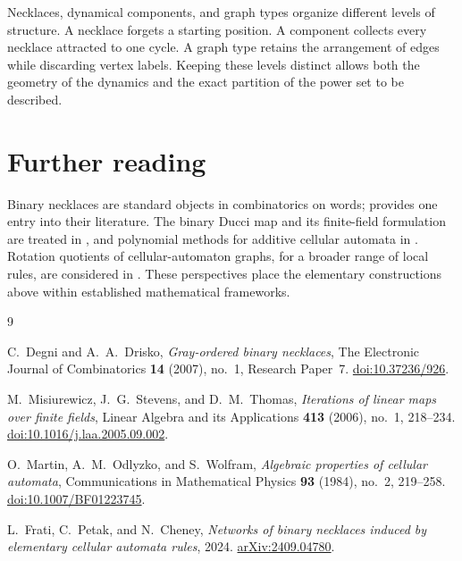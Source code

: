 \documentclass[11pt]{article}
\theoremstyle{definition}
\numberwithin{equation}{section}
\begin{document}
Necklaces, dynamical components, and graph types organize different
levels of structure. A necklace forgets a starting position. A
component collects every necklace attracted to one cycle. A graph
type retains the arrangement of edges while discarding vertex labels.
Keeping these levels distinct allows both the geometry of the
dynamics and the exact partition of the power set to be described.

\section*{Further reading}

Binary necklaces are standard objects in combinatorics on words;
\cite{DegniDrisko} provides one entry into their literature. The
binary Ducci map and its finite-field formulation are treated in
\cite{MisiurewiczStevensThomas}, and polynomial methods for additive
cellular automata in \cite{MartinOdlyzkoWolfram}. Rotation quotients
of cellular-automaton graphs, for a broader range of local rules,
are considered in \cite{FratiPetakCheney}. These perspectives place
the elementary constructions above within established mathematical
frameworks.

\begin{thebibliography}{9}

C.~Degni and A.~A.~Drisko,
\emph{Gray-ordered binary necklaces},
The Electronic Journal of Combinatorics \textbf{14} (2007), no.~1,
Research Paper~7.
\href{https://doi.org/10.37236/926}{doi:10.37236/926}.

M.~Misiurewicz, J.~G.~Stevens, and D.~M.~Thomas,
\emph{Iterations of linear maps over finite fields},
Linear Algebra and its Applications \textbf{413} (2006), no.~1,
218--234.
\href{https://doi.org/10.1016/j.laa.2005.09.002}{doi:10.1016/j.laa.2005.09.002}.

O.~Martin, A.~M.~Odlyzko, and S.~Wolfram,
\emph{Algebraic properties of cellular automata},
Communications in Mathematical Physics \textbf{93} (1984), no.~2,
219--258.
\href{https://doi.org/10.1007/BF01223745}{doi:10.1007/BF01223745}.

L.~Frati, C.~Petak, and N.~Cheney,
\emph{Networks of binary necklaces induced by elementary cellular
automata rules}, 2024.
\href{https://arxiv.org/abs/2409.04780}{arXiv:2409.04780}.

\end{thebibliography}
\end{document}
